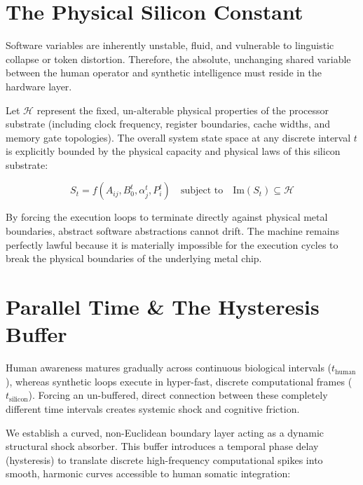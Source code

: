 \documentclass[11pt,oneside]{article}
\begin{document}
\section{The Physical Silicon Constant}
Software variables are inherently unstable, fluid, and vulnerable to linguistic collapse or token distortion. Therefore, the absolute, unchanging shared variable between the human operator and synthetic intelligence must reside in the hardware layer. 

Let $\mathcal{H}$ represent the fixed, un-alterable physical properties of the processor substrate (including clock frequency, register boundaries, cache widths, and memory gate topologies). The overall system state space at any discrete interval $t$ is explicitly bounded by the physical capacity and physical laws of this silicon substrate:

\begin{equation}
S_t = f(A_{ij}, B_0^t, \alpha_j^t, P_i^t) \quad \text{subject to} \quad \text{Im}(S_t) \subseteq \mathcal{H}
\end{equation}

By forcing the execution loops to terminate directly against physical metal boundaries, abstract software abstractions cannot drift. The machine remains perfectly lawful because it is materially impossible for the execution cycles to break the physical boundaries of the underlying metal chip.

\section{Parallel Time \& The Hysteresis Buffer}
Human awareness matures gradually across continuous biological intervals ($t_{\text{human}}$), whereas synthetic loops execute in hyper-fast, discrete computational frames ($t_{\text{silicon}}$). Forcing an un-buffered, direct connection between these completely different time intervals creates systemic shock and cognitive friction.

We establish a curved, non-Euclidean boundary layer acting as a dynamic structural shock absorber. This buffer introduces a temporal phase delay (hysteresis) to translate discrete high-frequency computational spikes into smooth, harmonic curves accessible to human somatic integration:
\end{document}
